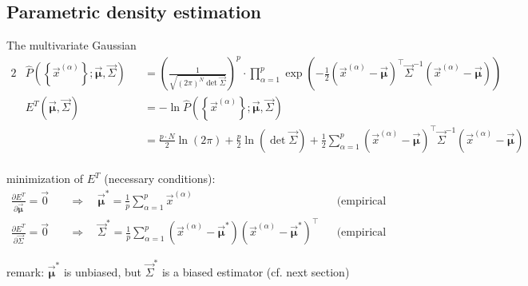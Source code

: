\subsection{Parametric density estimation}


\begin{frame}[t]{The multivariate Gaussian}
\smaller
\vspace{-0.8cm}
\begin{alignat*}{2}
&\widehat{P}\left(\left\{ \vec{x}^{(\alpha)} \right\}; \vec{\boldsymbol \mu}, \vec{\Sigma} \right) &&= \left( \frac{1}{\sqrt{(2\pi)^N \det \vec{\Sigma}}} \right)^p \cdot \prod_{\alpha=1}^{p} \exp \left(-\frac{1}{2} \left(\vec{x}^{(\alpha)} - \vec{\boldsymbol \mu} \right)^\top \vec{\Sigma}^{-1} \left(\vec{x}^{(\alpha)} - \vec{\boldsymbol \mu} \right) \right) \\[10pt]
&E^T\left( \vec{\boldsymbol \mu}, \vec{\Sigma} \right) &&= - \ln \widehat{P}\left(\left\{ \vec{x}^{(\alpha)} \right\}; \vec{\boldsymbol \mu}, \vec{\Sigma} \right) \\
& &&= \frac{p \cdot N}{2} \ln(2\pi) + \frac{p}{2} \ln(\det \vec{\Sigma}) + \frac{1}{2} \sum_{\alpha=1}^{p} \left(  \vec{x}^{(\alpha)} - \vec{\boldsymbol \mu} \right)^\top \vec{\Sigma}^{-1} \left(  \vec{x}^{(\alpha)} - \vec{\boldsymbol \mu} \right)
\end{alignat*}
\\\vspace{0.2cm}
minimization of $E^T$ (necessary conditions):
\vspace{-0.1cm}
\begin{align*}
\frac{\partial E^T}{\partial \vec{\boldsymbol \mu}} = \vec{0} \quad &\Rightarrow \quad \vec{\boldsymbol \mu}^* = \frac{1}{p} \sum_{\alpha=1}^{p} \vec{x}^{(\alpha)}  &&\text{(empirical average)}\\
\frac{\partial E^T}{\partial \vec{\Sigma}} = \vec{0} \quad &\Rightarrow \quad \vec{\Sigma}^* = \frac{1}{p} \sum_{\alpha=1}^{p} (\vec{x}^{(\alpha)} - \vec{\boldsymbol \mu}^*) (\vec{x}^{(\alpha)} - \vec{\boldsymbol \mu}^*)^\top &&\text{(empirical covariance matrix)}
\end{align*}

remark: $\vec{\boldsymbol \mu}^*$ is unbiased, but $\vec{\Sigma}^*$ is a biased estimator (cf. next section)

\end{frame}
